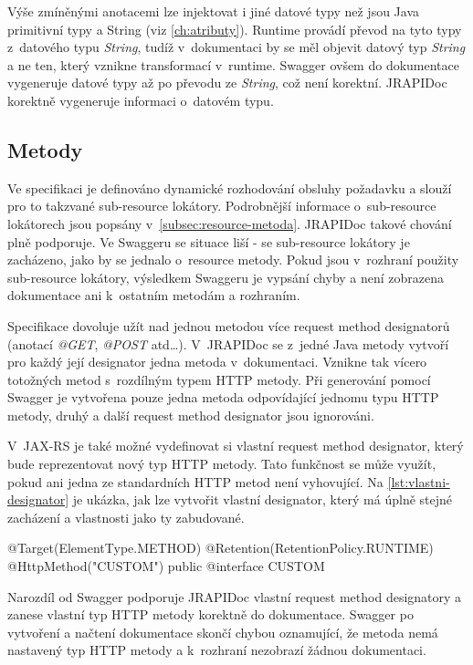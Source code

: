 \documentclass[11pt,twoside,a4paper]{book}
\begin{document}
Výše zmíněnými anotacemi lze injektovat i jiné datové typy než jsou Java
primitivní typy a String (viz \ref{ch:atributy}). Runtime provádí převod na tyto
typy z~datového typu {\em String}, tudíž v~dokumentaci by se měl objevit datový
typ {\em String} a ne ten, který vznikne transformací v~runtime.
Swagger ovšem do dokumentace vygeneruje datové typy až po převodu ze {\em
String}, což není korektní. JRAPIDoc korektně vygeneruje informaci o~datovém
typu.

\subsection{Metody}

Ve specifikaci je definováno dynamické rozhodování obsluhy požadavku a slouží
pro to takzvané sub-resource lokátory. Podrobnější informace o~sub-resource
lokátorech jsou popsány v~\ref{subsec:resource-metoda}. JRAPIDoc takové chování
plně podporuje. Ve Swaggeru se situace liší - se sub-resource lokátory  je
zacházeno, jako by se jednalo o~resource metody. Pokud jsou v~rozhraní
použity sub-resource lokátory, výsledkem Swaggeru je vypsání chyby a není 
zobrazena dokumentace ani k~ostatním metodám a rozhraním.

Specifikace dovoluje užít nad jednou metodou více request method designatorů
(anotací {\em @GET}, {\em @POST} atd\ldots). V~JRAPIDoc se z~jedné Java metody
vytvoří pro každý její designator jedna metoda v~dokumentaci. Vznikne tak vícero
totožných metod s~rozdílným typem HTTP metody. Při generování pomocí Swagger je
vytvořena pouze jedna metoda odpovídající jednomu typu HTTP metody, druhý a
další request method designator jsou ignorováni.

V~JAX-RS je také možné vydefinovat si vlastní request method designator, který
bude reprezentovat nový typ HTTP metody. Tato funkčnost se může využít, pokud
ani jedna ze standardních HTTP metod není vyhovující. Na
\ref{lst:vlastni-designator} je ukázka, jak lze vytvořit vlastní designator,
který má úplně stejné zacházení a vlastnosti jako ty zabudované.

\begin{code}[frame=single, caption={Vlastní request method
designator},label={lst:vlastni-designator}] 
@Target({ElementType.METHOD})
@Retention(RetentionPolicy.RUNTIME)
@HttpMethod("CUSTOM")
public @interface CUSTOM {
}
\end{code}

Narozdíl od Swagger podporuje JRAPIDoc vlastní request method designatory a
zanese vlastní typ HTTP metody korektně do dokumentace. Swagger po vytvoření a
načtení dokumentace skončí chybou oznamující, že metoda nemá nastavený typ HTTP
metody a k~rozhraní nezobrazí žádnou dokumentaci.
\end{document}
